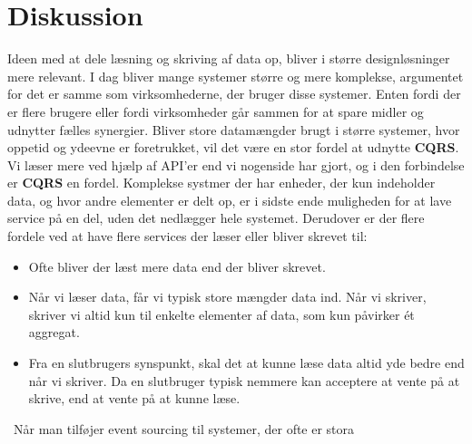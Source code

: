 \chapter{Diskussion}
Ideen med at dele læsning og skriving af data op, bliver i større designløsninger mere relevant. 
I dag bliver mange systemer større og mere komplekse, argumentet for det er samme som virksomhederne, der bruger disse systemer. Enten fordi der er flere brugere eller fordi virksomheder går sammen for at spare midler og udnytter fælles synergier.
Bliver store datamængder brugt i større systemer, hvor oppetid og ydeevne er foretrukket, vil det være en stor fordel at udnytte \textbf{CQRS}. 
Vi læser mere ved hjælp af API'er end vi nogenside har gjort, og i den forbindelse er \textbf{CQRS} en fordel. Komplekse systmer der har enheder, der kun indeholder data, og hvor andre elementer er delt op, er i sidste ende muligheden for at lave service på en del, uden det nedlægger hele systemet.
Derudover er der flere fordele ved at have flere services der læser eller bliver skrevet til:\
\begin{itemize}
    \item Ofte bliver der læst mere data end der bliver skrevet.
    \item Når vi læser data, får vi typisk store mængder data ind. Når vi skriver, skriver vi altid kun til enkelte elementer af data, som kun påvirker ét aggregat.
    \item Fra en slutbrugers synspunkt, skal det at kunne læse data altid yde bedre end når vi skriver. Da en slutbruger typisk nemmere kan acceptere at vente på at skrive, end at vente på at kunne læse.
\end{itemize}
\
Når man tilføjer event sourcing til systemer, der ofte er stora